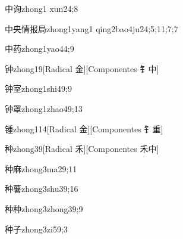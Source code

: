 \begin{verbete}{中询}{zhong1 xun2}{4;8}
\end{verbete}

\begin{verbete}{中央情报局}{zhong1yang1 qing2bao4ju2}{4;5;11;7;7}
\end{verbete}

\begin{verbete}{中药}{zhong1yao4}{4;9}
\end{verbete}

\begin{verbete}{钟}{zhong1}{9}[Radical 金][Componentes 钅中]
\end{verbete}

\begin{verbete}{钟室}{zhong1shi4}{9;9}
\end{verbete}

\begin{verbete}{钟罩}{zhong1zhao4}{9;13}
\end{verbete}

\begin{verbete}{锺}{zhong1}{14}[Radical 金][Componentes 钅重]
\end{verbete}

\begin{verbete}{种}{zhong3}{9}[Radical 禾][Componentes 禾中]
\end{verbete}

\begin{verbete}{种麻}{zhong3ma2}{9;11}
\end{verbete}

\begin{verbete}{种薯}{zhong3shu3}{9;16}
\end{verbete}

\begin{verbete}{种种}{zhong3zhong3}{9;9}
\end{verbete}

\begin{verbete}{种子}{zhong3zi5}{9;3}
\end{verbete}


